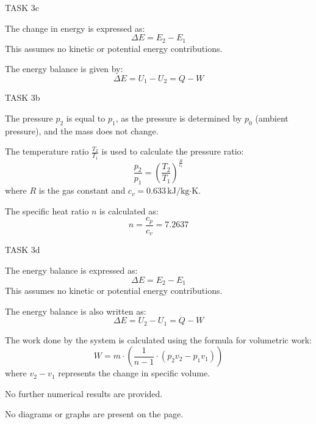 TASK 3c  

The change in energy is expressed as:  
\[
\Delta E = E_2 - E_1
\]  
This assumes no kinetic or potential energy contributions.  

The energy balance is given by:  
\[
\Delta E = U_1 - U_2 = Q - W
\]  

TASK 3b  

The pressure \( p_2 \) is equal to \( p_1 \), as the pressure is determined by \( p_0 \) (ambient pressure), and the mass does not change.  

The temperature ratio \( \frac{T_2}{T_1} \) is used to calculate the pressure ratio:  
\[
\frac{p_2}{p_1} = \left( \frac{T_2}{T_1} \right)^{\frac{R}{c_v}}
\]  
where \( R \) is the gas constant and \( c_v = 0.633 \, \text{kJ/kg·K} \).  

The specific heat ratio \( n \) is calculated as:  
\[
n = \frac{c_p}{c_v} = 7.2637
\]  

TASK 3d  

The energy balance is expressed as:  
\[
\Delta E = E_2 - E_1
\]  
This assumes no kinetic or potential energy contributions.  

The energy balance is also written as:  
\[
\Delta E = U_2 - U_1 = Q - W
\]  

The work done by the system is calculated using the formula for volumetric work:  
\[
W = m \cdot \left( \frac{1}{n-1} \cdot (p_2 v_2 - p_1 v_1) \right)
\]  
where \( v_2 - v_1 \) represents the change in specific volume.  

No further numerical results are provided.  

No diagrams or graphs are present on the page.